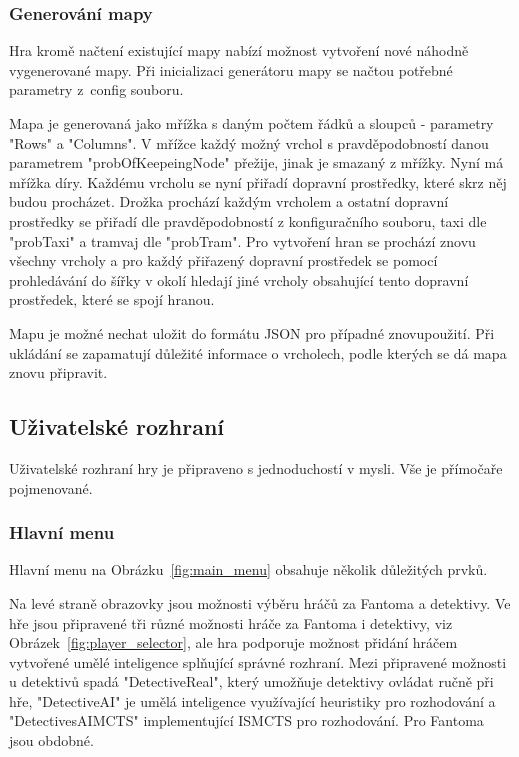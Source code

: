 \subsubsection{Generování mapy}
Hra kromě načtení existující mapy nabízí možnost vytvoření nové náhodně vygenerované mapy. Při inicializaci generátoru mapy se načtou potřebné parametry z~config souboru. 

Mapa je generovaná jako mřížka s daným počtem řádků a sloupců - parametry "Rows" a "Columns". V mřížce každý možný vrchol s pravděpodobností danou parametrem "probOfKeepeingNode" přežije, jinak je smazaný z mřížky. Nyní má mřížka díry. Každému vrcholu se nyní přiřadí dopravní prostředky, které skrz něj budou procházet. Drožka prochází každým vrcholem a ostatní dopravní prostředky se přiřadí dle pravděpodobností z konfiguračního souboru, taxi dle "probTaxi" a tramvaj dle "probTram". Pro vytvoření hran se prochází znovu všechny vrcholy a pro každý přiřazený dopravní prostředek se pomocí prohledávání do šířky v okolí hledají jiné vrcholy obsahující tento dopravní prostředek, které se spojí hranou.

Mapu je možné nechat uložit do formátu JSON pro případné znovupoužití. Při ukládání se zapamatují důležité informace o vrcholech, podle kterých se dá mapa znovu připravit. 

\subsection{Uživatelské rozhraní}

Uživatelské rozhraní hry je připraveno s jednoduchostí v mysli. Vše je přímočaře pojmenované. 

\subsubsection{Hlavní menu}

Hlavní menu na Obrázku~\ref{fig:main_menu} obsahuje několik důležitých prvků. 

Na levé straně obrazovky jsou možnosti výběru hráčů za Fantoma a detektivy. Ve hře jsou připravené tři různé možnosti hráče za Fantoma i detektivy, viz Obrázek~\ref{fig:player_selector}, ale hra podporuje možnost přidání hráčem vytvořené umělé inteligence splňující správné rozhraní. Mezi připravené možnosti u detektivů spadá "DetectiveReal", který umožňuje detektivy ovládat ručně při hře, "DetectiveAI" je umělá inteligence využívající heuristiky pro rozhodování a "DetectivesAIMCTS" implementující ISMCTS pro rozhodování. Pro Fantoma jsou obdobné. 

